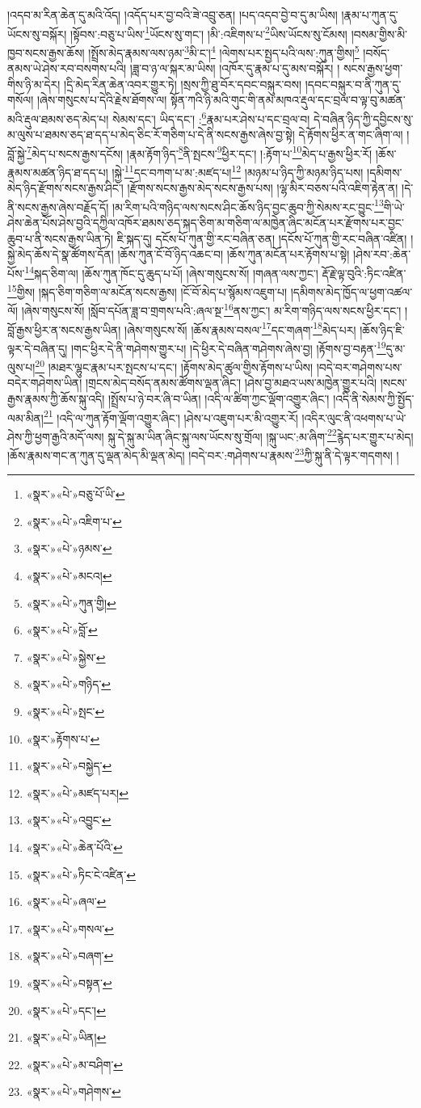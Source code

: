 །འདབ་མ་རིན་ཆེན་དུ་མའི་འོད། །འདོད་པར་བྱ་བའི་ཟེ་འབྲུ་ཅན། །པད་འདབ་བྱེ་བ་དུ་མ་ཡིས། །རྣམ་པ་ཀུན་དུ་ཡོངས་སུ་བསྐོར། །སྟོབས་:བཅུ་པ་ཡིས་\footnote{«སྣར་»«པེ་»བཅུ་པོ་ཡི་}ཡོངས་སུ་གང་། །མི་:འཇིགས་པ་\footnote{«སྣར་»«པེ་»འཇིག་པ་}ཡིས་ཡོངས་སུ་ངོམས། །བསམ་གྱིས་མི་ཁྱབ་སངས་རྒྱས་ཆོས། །སྤྲོས་མེད་རྣམས་ལས་ཉམ་\footnote{«སྣར་»«པེ་»ཉམས་}མི་ང་།\footnote{«སྣར་»«པེ་»མངའ།} །ལེགས་པར་སྤྱད་པའི་ལས་:ཀུན་གྱིས།\footnote{«སྣར་»«པེ་»ཀུན་གྱི།} །བསོད་ནམས་ཡེ་ཤེས་རབ་བསགས་པའི། །ཟླ་བ་ཉ་ལ་སྐར་མ་ཡིས། །འཁོར་དུ་རྣམ་པ་དུ་མས་བསྐོར། །
སངས་རྒྱས་ཕྱག་གིས་ཉི་མ་དེར། །དྲི་མེད་རིན་ཆེན་འབར་གྱུར་ཏེ། །སྲས་ཀྱི་ཐུ་བོར་དབང་བསྐུར་བས། །དབང་བསྐུར་བ་ནི་ཀུན་དུ་གསོལ། །ཞེས་གསུངས་པ་དེའི་རྗེས་ཐོགས་ལ། སྟོན་ཀའི་ཉི་མའི་གུང་གི་ནམ་མཁའ་རྡུལ་དང་བྲལ་བ་ལྟ་བུ་མཚན་མའི་རྡུལ་ཐམས་ཅད་མེད་པ། སེམས་དང་། ཡིད་དང་། :\footnote{«སྣར་»«པེ་»བློ་}རྣམ་པར་ཤེས་པ་དང་བྲལ་བ། དེ་བཞིན་ཉིད་ཀྱི་དབྱིངས་སུ་མ་ལུས་པ་ཐམས་ཅད་ཐ་དད་པ་མེད་ཅིང་རོ་གཅིག་པ་དེ་ནི་སངས་རྒྱས་ཞེས་བྱ་སྟེ། དེ་རྟོགས་ཕྱིར་ན་གང་ཞིག་ལ། །བློ་སྐྱེ་\footnote{«སྣར་»«པེ་»སྐྱེས་}མེད་པ་སངས་རྒྱས་དངོས། །རྣམ་རྟོག་ཉིད་\footnote{«སྣར་»«པེ་»གཉིད་}ནི་སྤངས་\footnote{«སྣར་»«པེ་»སྤང་}ཕྱིར་དང་། །:རྟོག་པ་\footnote{«སྣར་»རྟོགས་པ་}མེད་པ་རྒྱས་ཕྱིར་རོ། །ཆོས་རྣམས་མཚན་ཉིད་ཐ་དད་པ། །སྐྱེ་\footnote{«སྣར་»«པེ་»བསྐྱེད་}དང་བཀག་པ་མ་:མཛད་པ།\footnote{«སྣར་»«པེ་»མཛད་པར།} །མཉམ་པ་ཉིད་ཀྱི་མཉམ་ཉིད་པས། །དམིགས་མེད་ཉིད་རྫོགས་སངས་རྒྱས་ཤིང་། །རྫོགས་སངས་རྒྱས་མེད་སངས་རྒྱས་པས། །ལྷ་མིར་བཅས་པའི་འཇིག་རྟེན་ན། །དེ་ནི་སངས་རྒྱས་ཞེས་བརྗོད་དོ། །མ་རིག་པའི་གཉིད་ལས་སངས་ཤིང་ཆོས་ཉིད་བྱང་ཆུབ་ཀྱི་སེམས་རང་བྱུང་\footnote{«སྣར་»«པེ་»འབྱུང་}གི་ཡེ་ཤེས་ཆེན་པོས་ཤེས་བྱའི་དཀྱིལ་འཁོར་ཐམས་ཅད་སྐད་ཅིག་མ་གཅིག་ལ་མཁྱེན་ཞིང་མངོན་པར་རྫོགས་པར་བྱང་ཆུབ་པ་ནི་སངས་རྒྱས་ཡིན་ཏེ། ཇི་སྐད་དུ། དངོས་པོ་ཀུན་གྱི་རང་བཞིན་ཅན། །དངོས་པོ་ཀུན་གྱི་རང་བཞིན་འཛིན། །སྐྱེ་མེད་ཆོས་དེ་སྣ་ཚོགས་དོན། །ཆོས་ཀུན་ངོ་བོ་ཉིད་འཆང་བ། །ཆོས་ཀུན་མངོན་པར་རྟོགས་པ་སྟེ། །ཤེས་རབ་:ཆེན་པོས་\footnote{«སྣར་»«པེ་»ཆེན་པོའི་}སྐད་ཅིག་ལ། །ཆོས་ཀུན་ཁོང་དུ་ཆུད་པ་པོ། །ཞེས་གསུངས་སོ། །གཞན་ལས་ཀྱང་། རྡོ་རྗེ་ལྟ་བུའི་:ཏིང་འཛིན་\footnote{«སྣར་»«པེ་»ཏིང་ངེ་འཛིན་}གྱིས། །སྐད་ཅིག་གཅིག་ལ་མངོན་སངས་རྒྱས། །ངོ་བོ་མེད་པ་སྙོམས་འཇུག་པ། །དམིགས་མེད་ཁྱོད་ལ་ཕྱག་འཚལ་ལོ། །ཞེས་གསུངས་སོ། །སློབ་དཔོན་ཟླ་བ་གྲགས་པའི་:ཞལ་སྔ་\footnote{«སྣར་»«པེ་»ཞལ་}ནས་ཀྱང་། མ་རིག་གཉིད་ལས་སངས་ཕྱིར་དང་། །བློ་རྒྱས་ཕྱིར་ན་སངས་རྒྱས་ཡིན། །ཞེས་གསུངས་སོ། །ཆོས་རྣམས་བསལ་\footnote{«སྣར་»«པེ་»གསལ་}དང་གཞག་\footnote{«སྣར་»«པེ་»བཞག་}མེད་པར། །ཆོས་ཉིད་ཇི་ལྟར་དེ་བཞིན་དུ། །གང་ཕྱིར་དེ་ནི་གཤེགས་གྱུར་པ། །དེ་ཕྱིར་དེ་བཞིན་གཤེགས་ཞེས་བྱ། །རྟོགས་བྱ་བརྟན་\footnote{«སྣར་»«པེ་»བསྟན་}དུ་མ་ལུས་པ།\footnote{«སྣར་»«པེ་»དང་།} །མཐར་ལྷུང་རྣམ་པར་སྤངས་པ་དང་། །རྟོགས་མེད་ཚུལ་གྱིས་རྟོགས་པ་ཡིས། །བདེ་བར་གཤེགས་པས་བདེར་གཤེགས་ཡིན། །གྲངས་མེད་བསོད་ནམས་ཚོགས་ལྡན་ཞིང་། །ཤེས་བྱ་མཐའ་ཡས་མཁྱེན་གྱུར་པའི། །སངས་རྒྱས་རྣམས་ཀྱི་ཆོས་སྐུ་འདི། །སྤྲོས་པ་ཉེ་བར་ཞི་བ་ཡིན། །འདི་ལ་ཚིག་ཀྱང་ལྡོག་འགྱུར་ཞིང་། །འདི་ནི་སེམས་ཀྱི་སྤྱོད་ལམ་མིན།\footnote{«སྣར་»«པེ་»ཡིན།} །འདི་ལ་ཀུན་རྟོག་ལྡོག་འགྱུར་ཞིང་། །ཤེས་པ་འཇུག་པར་མི་འགྱུར་རོ། །འདིར་ལུང་ནི་འཕགས་པ་ཡེ་ཤེས་ཀྱི་ཕྱག་རྒྱའི་མདོ་ལས། སྐུ་དེ་སྐུ་མ་ཡིན་ཞིང་སྐུ་ལས་ཡོངས་སུ་གྲོལ། །སྐུ་ཡང་:མ་ཞིག་\footnote{«སྣར་»«པེ་»མ་བཤིག་}རྙེད་པར་གྱུར་པ་མེད། །ཆོས་རྣམས་གང་ན་ཀུན་དུ་ལྡན་མེད་མི་ལྡན་མེད། །བདེ་བར་:གཤེགས་པ་རྣམས་\footnote{«སྣར་»«པེ་»གཤེགས་}ཀྱི་སྐུ་ནི་དེ་ལྟར་གདགས། །
